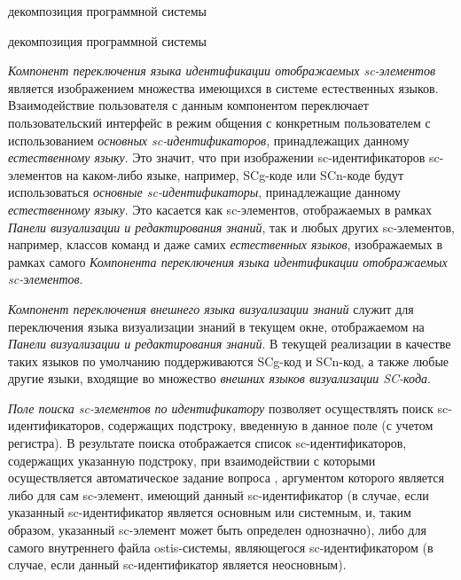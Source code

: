 \begin{SCn}
	\begin{scnrelfromset}{декомпозиция программной системы}
		\begin{scnindent}
			\begin{scnrelfromset}{декомпозиция программной системы}
			\end{scnrelfromset}
		\end{scnindent}
	\end{scnrelfromset}
\end{SCn}

\textit{Компонент переключения языка идентификации отображаемых sc-элементов} является изображением множества имеющихся в системе естественных языков. Взаимодействие пользователя с данным компонентом переключает пользовательский интерфейс в режим общения с конкретным пользователем с использованием \textit{основных sc-идентификаторов}, принадлежащих данному \textit{естественному языку}. Это значит, что при изображении sc-идентификаторов sc-элементов на каком-либо языке, например, SCg-коде или SCn-коде будут использоваться \textit{основные sc-идентификаторы}, принадлежащие данному \textit{естественному языку}. Это касается как sc-элементов, отображаемых в рамках \textit{Панели визуализации и редактирования знаний}, так и любых других sc-элементов, например, классов команд и даже самих \textit{естественных языков}, изображаемых в рамках самого \textit{Компонента переключения языка идентификации отображаемых sc-элементов}.

\textit{Компонент переключения внешнего языка визуализации знаний} служит для переключения языка визуализации знаний в текущем окне, отображаемом на \textit{Панели визуализации и редактирования знаний}. В текущей реализации в качестве таких языков по умолчанию поддерживаются SCg-код и SCn-код, а также любые другие языки, входящие во множество \textit{внешних языков визуализации SC-кода}.

\textit{Поле поиска sc-элементов по идентификатору} позволяет осуществлять поиск \mbox{sc-идентификаторов}, содержащих подстроку, введенную в данное поле (с учетом регистра). В результате поиска отображается список sc-идентификаторов, содержащих указанную подстроку, при взаимодействии с которыми осуществляется автоматическое задание вопроса , аргументом которого является либо для сам sc-элемент, имеющий данный sc-идентификатор (в случае, если указанный sc-идентификатор является основным или системным, и, таким образом, указанный sc-элемент может быть определен однозначно), либо для самого внутреннего файла ostis-системы, являющегося sc-идентификатором (в случае, если данный sc-идентификатор является неосновным).

